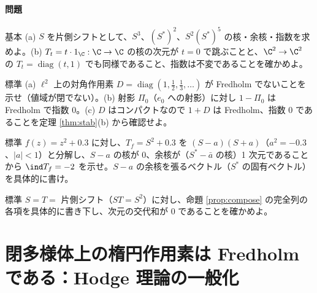 \paragraph{問題}
\begin{prob}{基本}\label{p:fredbasic}
(a) $S$ を片側シフトとして、$S^3$、$(S^*)^2$、$S^2(S^*)^5$ の核・余核・指数を求めよ。(b) $T_t=t\cdot1_{\C}:\C\to\C$ の核の次元が $t=0$ で跳ぶことと、$\C^2\to\C^2$ の $T_t=\operatorname{diag}(t,1)$ でも同様であること、指数は不変であることを確かめよ。
\end{prob}
\begin{prob}{標準}\label{p:notfred}
(a) $\ell^2$ 上の対角作用素 $D=\operatorname{diag}(1,\frac12,\frac13,\dots)$ が Fredholm でないことを示せ（値域が閉でない）。(b) 射影 $\Pi_0$（$e_0$ への射影）に対し $1-\Pi_0$ は Fredholm で指数 $0$。(c) $D$ はコンパクトなので $1+D$ は Fredholm、指数 $0$ であることを定理 \ref{thm:stab}(b) から確認せよ。
\end{prob}
\begin{prob}{標準}\label{p:toeplitz2}
$f(z)=z^2+0.3$ に対し、$T_f=S^2+0.3$ を $(S-a)(S+a)$（$a^2=-0.3$、$|a|<1$）と分解し、$S-a$ の核が $0$、余核が（$S^*-\bar a$ の核）1 次元であることから $\ind T_f=-2$ を示せ。$S-a$ の余核を張るベクトル（$S^*$ の固有ベクトル）を具体的に書け。
\end{prob}
\begin{prob}{標準}\label{p:sixterm}
$S=T=$ 片側シフト（$ST=S^2$）に対し、命題 \ref{prop:compose} の完全列の各項を具体的に書き下し、次元の交代和が $0$ であることを確かめよ。
\end{prob}

\section{閉多様体上の楕円作用素は Fredholm である：Hodge 理論の一般化}\label{sec:closed}
